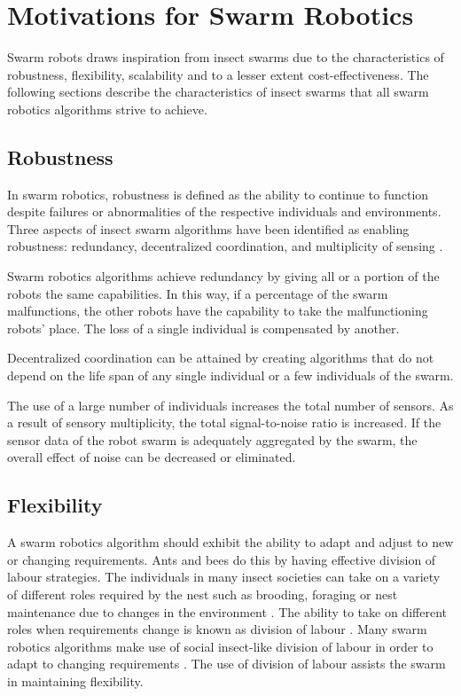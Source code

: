 \section{Motivations for Swarm Robotics}
\label{motivations}

Swarm robots draws inspiration from insect swarms due to the characteristics of robustness, flexibility, scalability and to a lesser extent cost-effectiveness. The following sections describe the characteristics of insect swarms that all swarm robotics algorithms strive to achieve. 

\subsection{Robustness}
\label{robustness}


In swarm robotics, robustness is defined as the ability to continue to function despite failures or abnormalities of the respective individuals and environments. Three aspects of insect swarm algorithms have been identified as enabling robustness: redundancy, decentralized coordination, and multiplicity of sensing \cite{csahin2005swarm}.

Swarm robotics algorithms achieve redundancy by giving all or a portion of the robots the same capabilities. In this way, if a percentage of the swarm malfunctions, the other robots have the capability to take the malfunctioning robots' place. The loss of a single individual is compensated by another.

Decentralized coordination can be attained by creating algorithms that do not depend on the life span of any single individual or a few individuals of the swarm.

The use of a large number of individuals increases the total number of sensors.  As a result of sensory multiplicity, the total signal-to-noise ratio is increased. If the sensor data of the robot swarm is adequately aggregated by the swarm, the overall effect of noise can be decreased or eliminated. 

\subsection{Flexibility}
\label{flexibility}

A swarm robotics algorithm should exhibit the ability to adapt and adjust to new or changing requirements. Ants and bees do this by having effective division of labour strategies. The individuals in many insect societies can take on a variety of different roles required by the nest such as brooding, foraging or nest maintenance due to changes in the environment \cite{morley1946division}. The ability to take on different roles when requirements change is known as division of labour \cite{beshers2001models}. Many swarm robotics algorithms make use of social insect-like division of labour in order to adapt to changing requirements  \cite{gerkey2004formal, labella2006division, liu2007towards}. The use of division of labour assists the swarm in maintaining flexibility.


